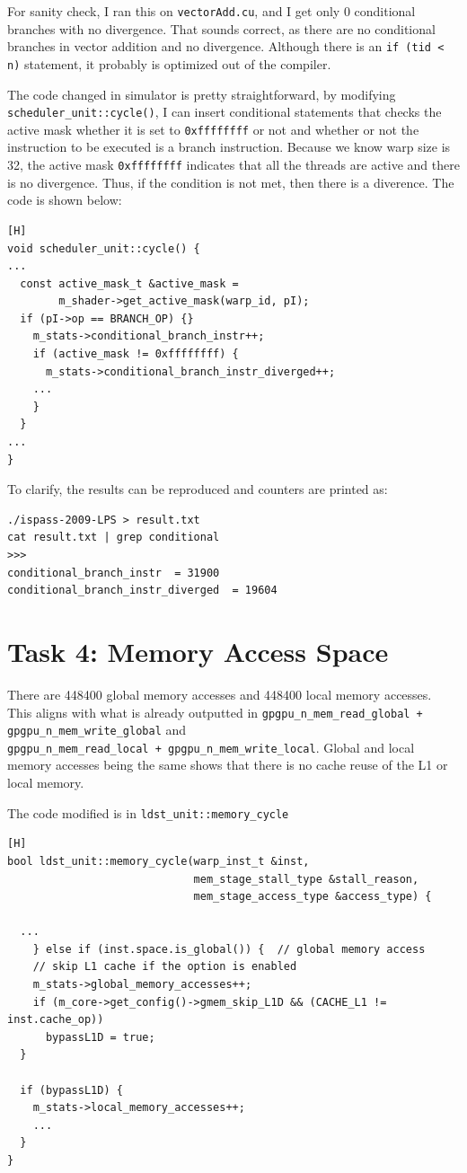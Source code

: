 \documentclass{article}
\begin{document}
For sanity check, I ran this on \verb|vectorAdd.cu|, and I get only 0 conditional branches with no divergence. That sounds correct, as there are no conditional branches in vector addition and no divergence. Although there is an \verb|if (tid < n)| statement, it probably is optimized out of the compiler.

The code changed in simulator is pretty straightforward, by modifying \verb|scheduler_unit::cycle()|, I can insert conditional statements that checks the active mask whether it is set to \verb|0xffffffff| or not and whether or not the instruction to be executed is a branch instruction. Because we know warp size is 32, the active mask \verb|0xffffffff| indicates that all the threads are active and there is no divergence. Thus, if the condition is not met, then there is a diverence. The code is shown below:

\begin{verbatim}[H]
void scheduler_unit::cycle() {
...
  const active_mask_t &active_mask =
        m_shader->get_active_mask(warp_id, pI);      
  if (pI->op == BRANCH_OP) {}
    m_stats->conditional_branch_instr++;
    if (active_mask != 0xffffffff) {
      m_stats->conditional_branch_instr_diverged++;
    ...
    }
  }
...
}
\end{verbatim}

To clarify, the results can be reproduced and counters are printed as:
\begin{verbatim}
./ispass-2009-LPS > result.txt
cat result.txt | grep conditional
>>>
conditional_branch_instr  = 31900
conditional_branch_instr_diverged  = 19604
\end{verbatim}

\section{Task 4: Memory Access Space}

There are 448400 global memory accesses and 448400 local memory accesses. This aligns with what is already outputted in \verb|gpgpu_n_mem_read_global + gpgpu_n_mem_write_global| and
\\\verb|gpgpu_n_mem_read_local + gpgpu_n_mem_write_local|. Global and local memory accesses being the same shows that there is no cache reuse of the L1 or local memory.

The code modified is in \verb|ldst_unit::memory_cycle|
\begin{verbatim}[H]
bool ldst_unit::memory_cycle(warp_inst_t &inst,
                             mem_stage_stall_type &stall_reason,
                             mem_stage_access_type &access_type) {

  ...
    } else if (inst.space.is_global()) {  // global memory access
    // skip L1 cache if the option is enabled
    m_stats->global_memory_accesses++;
    if (m_core->get_config()->gmem_skip_L1D && (CACHE_L1 != inst.cache_op))
      bypassL1D = true;
  }

  if (bypassL1D) {
    m_stats->local_memory_accesses++;
    ...
  } 
}
\end{verbatim}
\end{document}
